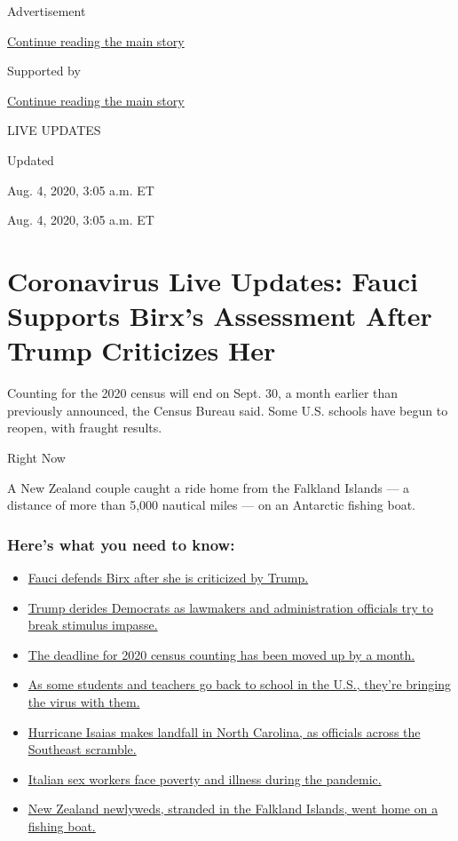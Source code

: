 Advertisement

\protect\hyperlink{after-top}{Continue reading the main story}

Supported by

\protect\hyperlink{after-sponsor}{Continue reading the main story}

LIVE UPDATES

Updated~

Aug. 4, 2020, 3:05 a.m. ET

Aug. 4, 2020, 3:05 a.m. ET

\hypertarget{coronavirus-live-updates-fauci-supports-birxs-assessment-after-trump-criticizes-her}{%
\section{Coronavirus Live Updates: Fauci Supports Birx's Assessment
After Trump Criticizes
Her}\label{coronavirus-live-updates-fauci-supports-birxs-assessment-after-trump-criticizes-her}}

Counting for the 2020 census will end on Sept. 30, a month earlier than
previously announced, the Census Bureau said. Some U.S. schools have
begun to reopen, with fraught results.

Right Now

A New Zealand couple caught a ride home from the Falkland Islands --- a
distance of more than 5,000 nautical miles --- on an Antarctic fishing
boat.

\hypertarget{heres-what-you-need-to-know}{%
\subsubsection{Here's what you need to
know:}\label{heres-what-you-need-to-know}}

\begin{itemize}
\tightlist
\item
  \protect\hyperlink{link-4547638f}{Fauci defends Birx after she is
  criticized by Trump.}
\item
  \protect\hyperlink{link-15e7f995}{Trump derides Democrats as lawmakers
  and administration officials try to break stimulus impasse.}
\item
  \protect\hyperlink{link-e5a2cda}{The deadline for 2020 census counting
  has been moved up by a month.}
\item
  \protect\hyperlink{link-4c85ed64}{As some students and teachers go
  back to school in the U.S., they're bringing the virus with them.}
\item
  \protect\hyperlink{link-5ccc012}{Hurricane Isaias makes landfall in
  North Carolina, as officials across the Southeast scramble.}
\item
  \protect\hyperlink{link-6bfd36ea}{Italian sex workers face poverty and
  illness during the pandemic.}
\item
  \protect\hyperlink{link-bfeb498}{New Zealand newlyweds, stranded in
  the Falkland Islands, went home on a fishing boat.}
\end{itemize}

